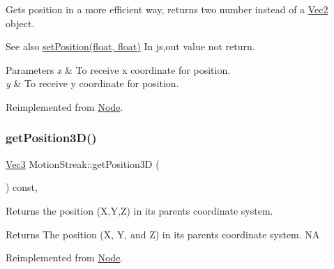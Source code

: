 Gets position in a more efficient way, returns two number instead of a \hyperlink{classVec2}{Vec2} object.

\begin{DoxySeeAlso}{See also}
{\ttfamily \hyperlink{classMotionStreak_a8799ee17a6842cad944b85d67f1155d0}{set\+Position(float, float)}} In js,out value not return.
\end{DoxySeeAlso}

\begin{DoxyParams}{Parameters}
{\em x} & To receive x coordinate for position. \\
\hline
{\em y} & To receive y coordinate for position. \\
\hline
\end{DoxyParams}


Reimplemented from \hyperlink{classNode_a216f30e9a2dda896b2ffff1885b33a98}{Node}.

\mbox{\label{classMotionStreak_afa9dc064ec1140bf1e14e526221d5b72}} 
\subsubsection{\texorpdfstring{get\+Position3\+D()}{getPosition3D()}\hspace{0.1cm}{\footnotesize\ttfamily [1/2]}}
{\footnotesize\ttfamily \hyperlink{classVec3}{Vec3} Motion\+Streak\+::get\+Position3D (\begin{DoxyParamCaption}{ }\end{DoxyParamCaption}) const\hspace{0.3cm}{\ttfamily [override]}, {\ttfamily [virtual]}}

Returns the position (X,Y,Z) in its parent\textquotesingle{}s coordinate system.

\begin{DoxyReturn}{Returns}
The position (X, Y, and Z) in its parent\textquotesingle{}s coordinate system.  NA 
\end{DoxyReturn}


Reimplemented from \hyperlink{classNode_a8617dd2eb9af75a66ebaff0d3c99285e}{Node}.

\mbox{\label{classMotionStreak_ab07adb87a9770b5bbafa2fff999515f6}} 
